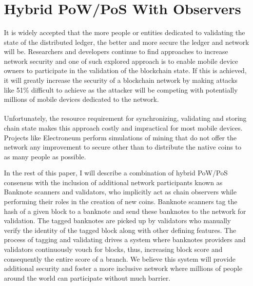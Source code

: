 \section{Hybrid PoW/PoS With Observers}
	\paragraph{}{
		It is widely accepted that the more people or entities dedicated to validating the state of the distributed ledger, the better and more secure the ledger and network will be. Researchers and developers continue to find approaches to increase network security and one of such explored approach is to enable mobile device owners to participate in the validation of the blockchain state. If this is achieved, it will greatly increase the security of a blockchain network by making attacks like 51\% difficult to achieve as the attacker will be competing with potentially millions of mobile devices dedicated to the network. 
	\vspace{-5mm}
	\paragraph{}{
	Unfortunately, the resource requirement for synchronizing, validating and storing chain state makes this approach costly and impractical for most mobile devices. 
Projects like Electroneum\cite{electroneum} perform simulations of mining that do not offer the network any improvement to secure other than to distribute the native coins to as many people as possible.	}

In the rest of this paper, I will describe a combination of hybrid PoW/PoS consensus with the inclusion of additional network participants known as Banknote scanners and validators, who implicitly act as chain observers while performing their roles in the creation of new coins. Banknote scanners tag the hash of a given block to a banknote and send these banknotes to the network for validation. The tagged banknotes are picked up by validators who manually verify the identity of the tagged block along with other defining features. The process of tagging and validating drives a system where banknotes providers and validators continuously vouch for blocks, thus, increasing block score and consequently the entire score of a branch. We believe this system will provide additional security and foster a more inclusive network where millions of people around the world can participate without much barrier. 
}

\vspace{5mm}
